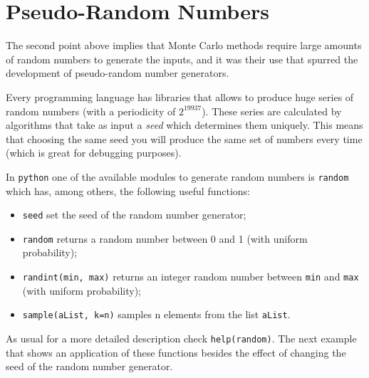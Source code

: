 \section{Pseudo-Random Numbers}\label{pseudo-random-numbers}

The second point above implies that Monte Carlo methods require 
large amounts of random numbers to
generate the inputs, and it was their use that spurred the development
of pseudo-random number generators. 

Every programming language has libraries that
allows to produce huge series of random numbers (with a periodicity of
\(2^{19937}\)). These series are calculated by algorithms that take as
input a \emph{seed} which determines them uniquely. This means
that choosing the same seed you will produce the same set of numbers
every time (which is great for debugging purposes).

In \texttt{python} one of the available modules to generate random numbers is \texttt{random} which has, among others, the following useful functions:
\begin{itemize}
\tightlist
\item
  \texttt{seed} set the seed of the random number generator;
\item
  \texttt{random} returns a random number between 0 and 1 (with uniform
  probability);
\item
  \texttt{randint(min,\ max)} returns an integer random number between
  \texttt{min} and \texttt{max} (with uniform probability);
\item
  \texttt{sample(aList,\ k=n)} samples n elements from the list
  \texttt{aList}.
\end{itemize}
As usual for a more detailed description check \texttt{help(random)}.
The next example that shows an application of these functions besides the effect of  changing the seed of the random number generator.

